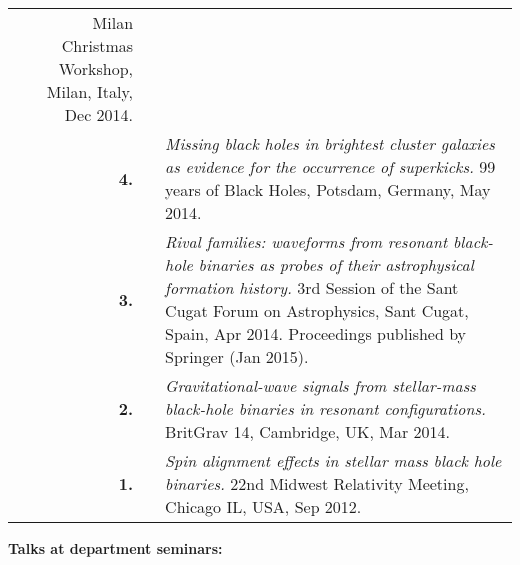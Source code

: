 \documentclass[11pt,letterpaper,sans]{moderncv}   %
\begin{document}
{\begin{longtable}{rp{0.4cm}p{15.8cm}}
Milan Christmas Workshop, Milan, Italy, Dec 2014.
\vspace{0.05cm}\\
\textbf{4.} & & \textit{Missing black holes in brightest cluster galaxies as evidence for the occurrence of superkicks.}
\newline{} 
99 years of Black Holes, Potsdam, Germany, May 2014.
\vspace{0.05cm}\\
\textbf{3.} & & \textit{Rival families: waveforms from resonant black-hole binaries as probes of their astrophysical formation history.}
\newline{} 
3rd Session of the Sant Cugat Forum on Astrophysics, Sant Cugat, Spain, Apr 2014.
\newline{} 
Proceedings published by Springer (Jan 2015).
\vspace{0.05cm}\\
\textbf{2.} & & \textit{Gravitational-wave signals from stellar-mass black-hole binaries in resonant configurations.}
\newline{} 
BritGrav 14, Cambridge, UK, Mar 2014.
\vspace{0.05cm}\\
\textbf{1.} & & \textit{Spin alignment effects in stellar mass black hole binaries.}
\newline{} 
22nd Midwest Relativity Meeting, Chicago IL, USA, Sep 2012.
\vspace{0.05cm}\\
\end{longtable}
}

\textcolor{color1}{\textbf{Talks at department seminars:}}
\vspace{-0.5cm}
\end{document}
